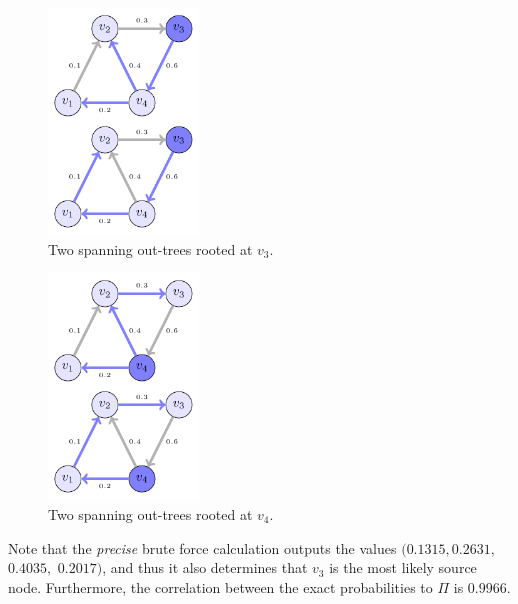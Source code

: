\documentclass[sigconf,anonymous]{aamas}
\begin{document}



\begin{figure}[hbpt] 
    \centering
    \includegraphics[width= 4cm]{example_spreading_patterns_of_v_3.pdf}
  \caption{Two spanning out-trees rooted at $v_3$.} 
    \label{figv3}
\end{figure}

\begin{figure}[hbpt] 
    \centering
    \includegraphics[width= 4cm]{example_spreading_patterns_of_v_4.pdf}
  \caption{Two spanning out-trees rooted at $v_4$.} %
    \label{figv4}
\end{figure}

Note that the \textit{precise} brute force calculation outputs the values $(0.1315,0.2631,$ $0.4035,$ $0.2017)$, and thus it also determines that $v_3$ is the most likely source node. Furthermore, the correlation between the exact probabilities to $\Pi$ is $0.9966$. %
\end{document}
